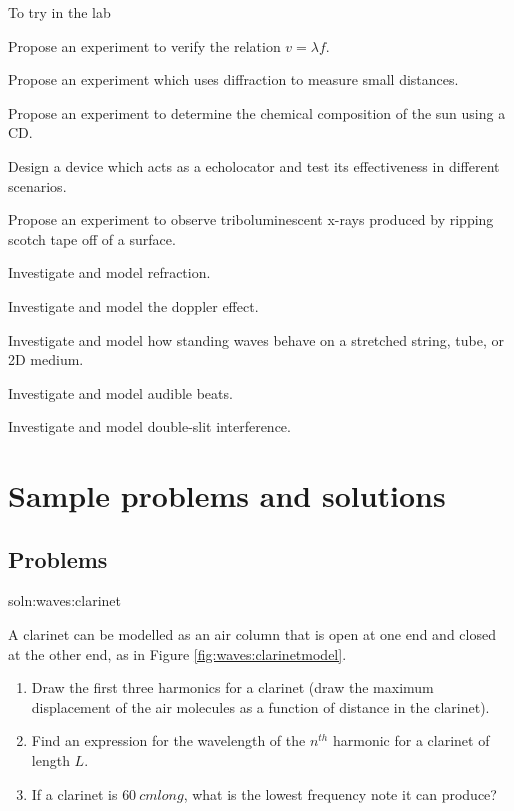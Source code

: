 \begin{chapteractivity}{To try in the lab}
{
\item Propose an experiment to verify the relation $v=\lambda f$.
\item Propose an experiment which uses diffraction to measure small distances.
\item Propose an experiment to determine the chemical composition of the sun using a CD.
\item Design a device which acts as a echolocator and test its effectiveness in different scenarios.
\item Propose an experiment to observe triboluminescent x-rays produced by ripping scotch tape off of a surface.
\item Investigate and model refraction.
\item Investigate and model the doppler effect.
\item Investigate and model how standing waves behave on a stretched string, tube, or 2D medium.
\item Investigate and model audible beats.
\item Investigate and model double-slit interference.
}
\end{chapteractivity}


\newpage
\section{Sample problems and solutions}
\subsection{Problems}

\begin{problem}{soln:waves:clarinet}{\label{prob:waves:clarinet} A clarinet can be modelled as an air column that is open at one end and closed at the other end, as in Figure \ref{fig:waves:clarinetmodel}.
\begin{enumerate}[label=\alph*),topsep=-10pt]
\item Draw the first three harmonics for a clarinet (draw the maximum displacement of the air molecules as a function of distance in the clarinet).
\item Find an expression for the wavelength of the $n^{th}$ harmonic for a clarinet of length $L$.
\item If a clarinet is $\SI{60}{cm} long$, what is the lowest frequency note it can produce?
\end{enumerate}
}
\end{problem}

